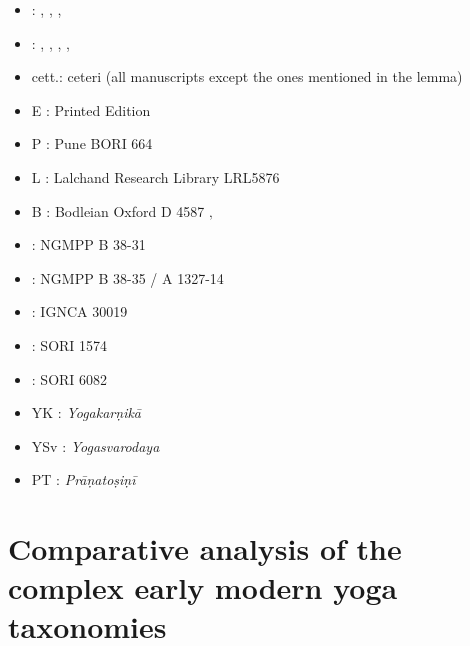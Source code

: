 \begin{itemize}
\item \alpha : , ,  , 
\item \beta : , ,  , , 
\item cett.: ceteri (all manuscripts except the ones mentioned in the lemma)
\item E : Printed Edition
\item P : Pune BORI 664
\item L : Lalchand Research Library LRL5876
\item B : Bodleian Oxford D 4587
‚\item \None : NGMPP B 38-31
\item \Ntwo : NGMPP B 38-35 / A 1327-14
\item \Done : IGNCA 30019
\item \Uone : SORI 1574
\item \Utwo : SORI 6082
\item YK : \emph{Yogakarṇikā}
\item YSv : \emph{Yogasvarodaya}
\item PT : \emph{Prāṇatoṣiṇī}
\end{itemize}



\chapter{Comparative analysis of the complex early modern yoga taxonomies}
\label{yogas_list}
\label{yogatax}
\clearpage






